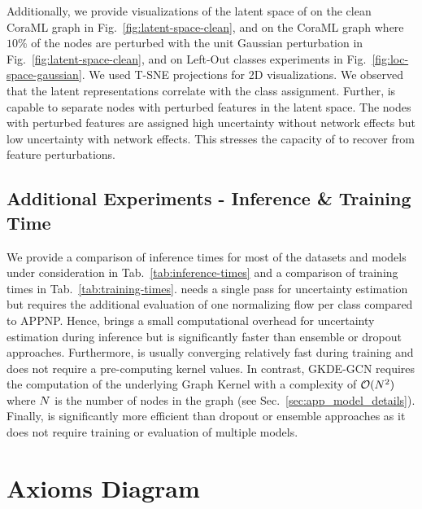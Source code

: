 Additionally, we provide visualizations of the latent space of \oursacro{} on the clean CoraML graph in Fig.~\ref{fig:latent-space-clean}, and on the CoraML graph where $10\%$ of the nodes are perturbed with  the unit Gaussian perturbation in Fig.~\ref{fig:latent-space-clean}, and on Left-Out classes experiments in Fig.~\ref{fig:loc-space-gaussian}. We used T-SNE projections for 2D visualizations. We observed that the latent representations correlate with the class assignment. Further, \oursacro{} is capable to separate nodes with perturbed features in the latent space. The nodes with perturbed features are assigned high uncertainty without network effects but low uncertainty with network effects. This stresses the capacity of \oursacro{} to recover from feature perturbations. 
%

%

%


\subsection{Additional Experiments - Inference \& Training Time}
\label{sec:add-exp-time}

We provide a comparison of inference times for most of the datasets and models under consideration in Tab.~\ref{tab:inference-times} and a comparison of training times in Tab.~\ref{tab:training-times}. \oursacro{} needs a single pass for uncertainty estimation but requires the additional evaluation of one normalizing flow per class compared to APPNP. Hence, \oursacro{} brings a small computational overhead for uncertainty estimation during inference but is significantly faster than ensemble or dropout approaches. Furthermore, \oursacro{} is usually converging relatively fast during training and does not require a pre-computing kernel values. In contrast, GKDE-GCN requires the computation of the underlying Graph Kernel with a complexity of $\mathcal{O}(N^2)$ where $N$ is the number of nodes in the graph (see Sec.~\ref{sec:app_model_details}). Finally, \oursacro{} is significantly more efficient than dropout or ensemble approaches as it does not require training or evaluation of multiple models.




\section{Axioms Diagram}

